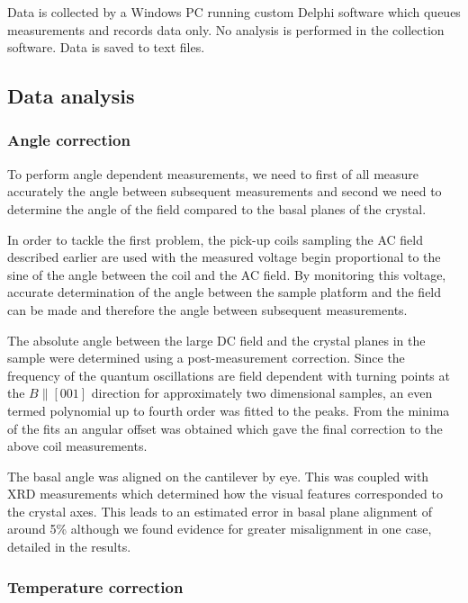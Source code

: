 Data is collected by a Windows PC running custom Delphi software which queues measurements and records data only. No analysis is performed in the collection software. Data is saved to text files.

\subsection{Data analysis}

\subsubsection{Angle correction}
    \label{Sec:Exp:AngleCorrection}

To perform angle dependent measurements, we need to first of all measure accurately the angle between subsequent measurements and second we need to determine the angle of the field compared to the basal planes of the crystal. 

In order to tackle the first problem, the pick-up coils sampling the AC field described earlier are used with the measured voltage begin proportional to the sine of the angle between the coil and the AC field. By monitoring this voltage, accurate determination of the angle between the sample platform and the field can be made and therefore the angle between subsequent measurements.

The absolute angle between the large DC field and the crystal planes in the sample were determined using a post-measurement correction. Since the frequency of the quantum oscillations are field dependent with turning points at the $B\parallel [001]$ direction for approximately two dimensional samples, an even termed polynomial up to fourth order was fitted to the peaks. From the minima of the fits an angular offset was obtained which gave the final correction to the above coil measurements.

The basal angle was aligned on the cantilever by eye. This was coupled with \ac{XRD} measurements which determined how the visual features corresponded to the crystal axes. This leads to an estimated error in basal plane alignment of around \unit{5}{\%} although we found evidence for greater misalignment in one case, detailed in the results.

\subsubsection{Temperature correction}
    \label{Sec:Exp:TemperatureCorrection}

